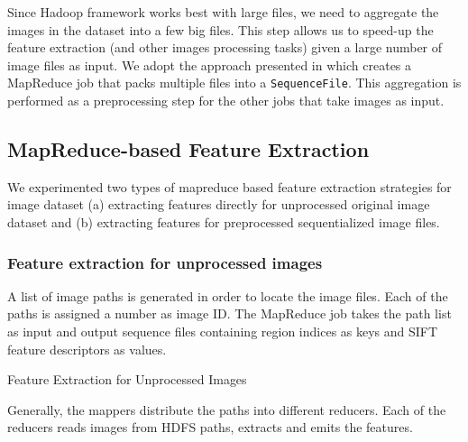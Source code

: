 \documentclass{acm_proc_article-sp}
\begin{document}
Since Hadoop framework works best with large files, we need to aggregate the images in the dataset into a few big files. This step allows us to speed-up the feature extraction (and other images processing tasks) given a large number of image files as input. We adopt the approach presented in\cite{combinefiles} which creates a MapReduce job that packs multiple files into a \texttt{SequenceFile}. This aggregation is performed as a preprocessing step for the other jobs that take images as input.

\subsection{MapReduce-based Feature Extraction}
We experimented two types of mapreduce based feature extraction strategies for image dataset (a)
extracting features directly for unprocessed original image dataset and (b) extracting features for
preprocessed sequentialized image files.
\subsubsection{Feature extraction for unprocessed images}
A list of image paths is generated in order to locate the image files. Each of the paths is assigned a number as image ID. The MapReduce job takes the path list as input and output sequence files containing region indices as keys and SIFT feature descriptors as values.
\begin{algorithm}[!htb]
\SetAlgoVlined
{}
\caption{Feature Extraction for Unprocessed Images}
\end{algorithm}
Generally, the mappers distribute the paths into different reducers. Each of the reducers reads images from HDFS paths, extracts and emits the features.
\end{document}
